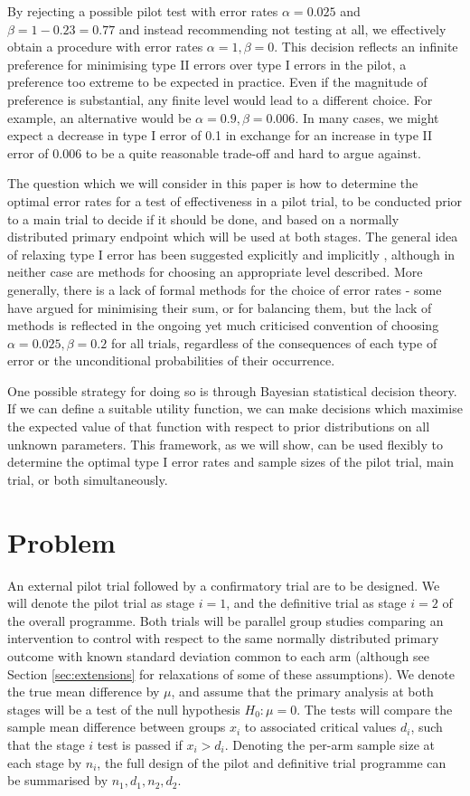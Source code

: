 \documentclass[sagev]{sagej}
\begin{document}
By rejecting a possible pilot test with error rates $\alpha = 0.025$ and $\beta = 1 - 0.23 = 0.77$ and instead recommending not testing at all, we effectively obtain a procedure with error rates $\alpha = 1, \beta = 0$. This decision reflects an infinite preference for minimising type II errors over type I errors in the pilot, a preference too extreme to be expected in practice. Even if the magnitude of preference is substantial, any finite level would lead to a different choice. For example, an alternative would be $\alpha = 0.9, \beta = 0.006$. In many cases, we might expect a decrease in type I error of 0.1 in exchange for an increase in type II error of 0.006 to be a quite reasonable trade-off and hard to argue against.

The question which we will consider in this paper is how to determine the optimal error rates for a test of effectiveness in a pilot trial, to be conducted prior to a main trial to decide if it should be done, and based on a normally distributed primary endpoint which will be used at both stages. The general idea of relaxing type I error has been suggested explicitly \cite{Lee2014} and implicitly \cite{Cocks2013}, although in neither case are methods for choosing an appropriate level described. More generally, there is a lack of formal methods for the choice of error rates - some have argued for minimising their sum, or for balancing them, but the lack of methods is reflected in the ongoing yet much criticised convention of choosing $\alpha = 0.025, \beta = 0.2$ for all trials, regardless of the consequences of each type of error or the unconditional probabilities of their occurrence.

One possible strategy for doing so is through Bayesian statistical decision theory. If we can define a suitable utility function, we can make decisions which maximise the expected value of that function with respect to prior distributions on all unknown parameters. This framework, as we will show, can be used flexibly to determine the optimal type I error rates and sample sizes of the pilot trial, main trial, or both simultaneously.


\section{Problem}

An external pilot trial followed by a confirmatory trial are to be designed. We will denote the pilot trial as stage $i=1$, and the definitive trial as stage $i=2$ of the overall programme. Both trials will be parallel group studies comparing an intervention to control with respect to the same normally distributed primary outcome with known standard deviation common to each arm (although see Section \ref{sec:extensions} for relaxations of some of these assumptions). We denote the true mean difference by $\mu$, and assume that the primary analysis at both stages will be a test of the null hypothesis $H_0: \mu = 0$. The tests will compare the sample mean difference between groups $x_i$ to associated critical values $d_i$, such that the stage $i$ test is passed if $x_i > d_i$. Denoting the per-arm sample size at each stage by $n_i$, the full design of the pilot and definitive trial programme can be summarised by $n_1, d_1, n_2, d_2$. 
\end{document}
